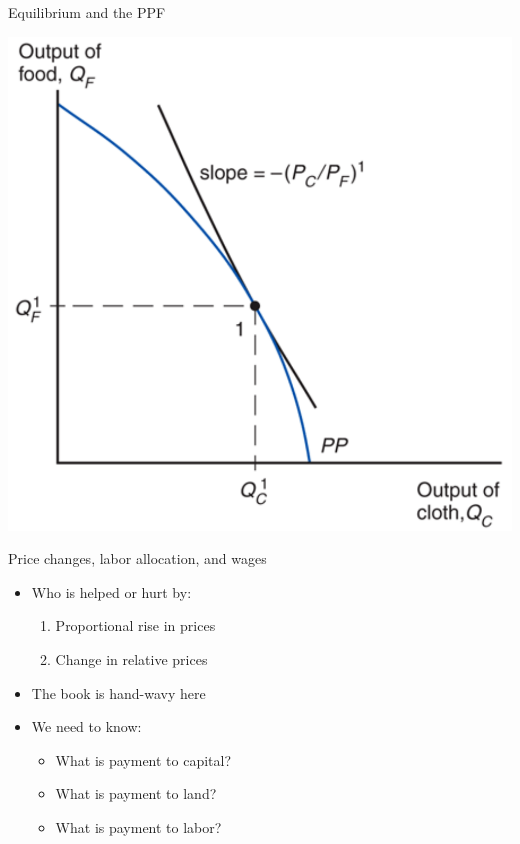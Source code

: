 \documentclass[ignorenonframetext,]{beamer}
\begin{document}
\begin{frame}{Equilibrium and the PPF}

    \includegraphics[scale=0.25]{ppf_equib.png}

\end{frame}

\begin{frame}{Price changes, labor allocation, and wages}

        \begin{itemize}
            \item Who is helped or hurt by:
            \begin{enumerate}
                \item Proportional rise in prices
                \item Change in relative prices 
            \end{enumerate}
            \item The book is hand-wavy here 
            \item We need to know:
            \begin{itemize}
                \item What is payment to capital?
                \item What is payment to land?
                \item What is payment to labor?
            \end{itemize}
        \end{itemize}

\end{frame}
\end{document}
